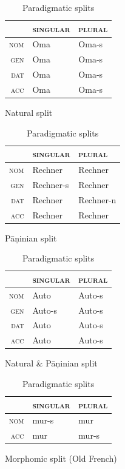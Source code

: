 \begin{table}[htb]
  \centering
  
  \begin{subfigure}{.45\textwidth}
    \begin{tabular}{r|ll}
      \toprule
      & \textsc{singular} & \textsc{plural}\\
      \midrule
      \textsc{nom} & Oma & Oma-s\\
      \textsc{gen} & Oma & Oma-s\\
      \textsc{dat} & Oma & Oma-s\\
      \textsc{acc} & Oma & Oma-s\\
      \bottomrule
    \end{tabular}

    \caption{Natural split}
  \end{subfigure}  
  \begin{subfigure}{.45\textwidth}
    \begin{tabular}{r|ll}
      \toprule
      & \textsc{singular} & \textsc{plural}\\
      \midrule
      \textsc{nom} & Rechner & Rechner\\
      \textsc{gen} & Rechner-s & Rechner\\
      \textsc{dat} & Rechner & Rechner-n\\
      \textsc{acc} & Rechner & Rechner\\
      \bottomrule
    \end{tabular}
    \caption{Pāṇinian split}
  \end{subfigure}

  \begin{subfigure}{.45\textwidth}
      \begin{tabular}{r|ll}
        \toprule
        & \textsc{singular} & \textsc{plural}\\
        \midrule
        \textsc{nom} & Auto & Auto-s\\
        \textsc{gen} & Auto-s & Auto-s\\
        \textsc{dat} & Auto & Auto-s\\
        \textsc{acc} & Auto & Auto-s\\
        \bottomrule
      \end{tabular}
      \caption{Natural \& Pāṇinian split}
    \end{subfigure}
  \begin{subfigure}{.45\textwidth}
    \begin{tabular}{r|ll}
      \toprule
      & \textsc{singular} & \textsc{plural}\\
      \midrule
      \textsc{nom} & mur-s & mur\\
      \textsc{acc} & mur & mur-s\\
      \bottomrule
    \end{tabular}

    \caption{Morphomic split (Old French)}
  \end{subfigure}
  
  
  \caption{Paradigmatic splits}
  \label{tab:ParaSplit}
\end{table}


